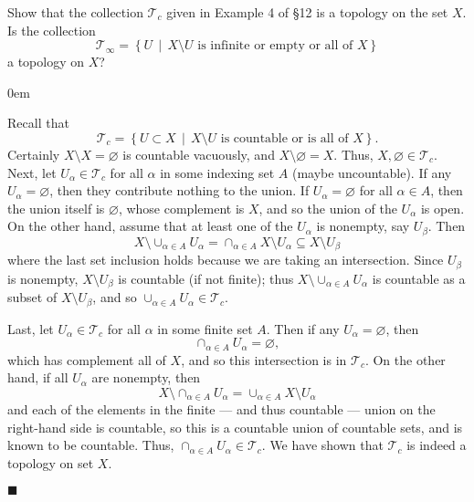 \documentclass[12pt]{article}
\renewcommand{\qed}{\hfill$\blacksquare$}
\renewenvironment{proof}{\begin{addmargin}[1em]{0em}\begin{newproof}}{\end{newproof}\end{addmargin}\qed}
\newenvironment{problem}[2][Exercise]{\begin{trivlist}
\item[\hskip \labelsep {\bfseries #1}\hskip \labelsep {\bfseries #2.}]}{\end{trivlist}}
\begin{document}
\begin{problem}{13.3}
	Show that the collection $\mathcal{T}_c$ given in Example 4 of \S12 is a topology on the set $X$. Is the collection $$ \mathcal{T}_{\infty} = \left\{ U \, \middle| \, X\setminus U \text{ is infinite or empty or all of } X \right\} $$ a topology on $X$?
\end{problem}
\begin{proof}
	Recall that $$\mathcal{T}_c = \left\{ U\subset X \, \middle| \, X\setminus U \text{ is countable or is all of } X \right\}.$$ Certainly $X\setminus X=\varnothing$ is countable vacuously, and $X\setminus \varnothing = X$. Thus, $X,\varnothing \in \mathcal{T}_c$. Next, let $U_{\alpha} \in \mathcal{T}_c$ for all $\alpha$ in some indexing set $A$ (maybe uncountable). If any $U_{\alpha} = \varnothing$, then they contribute nothing to the union. If $U_{\alpha} = \varnothing$ for all $\alpha \in A$, then the union itself is $\varnothing$, whose complement is $X$, and so the union of the $U_{\alpha}$ is open. On the other hand, assume that at least one of the $U_{\alpha}$ is nonempty, say $U_{\beta}$. Then $$ X\setminus \cup_{\alpha \in A} U_{\alpha} = \cap_{\alpha \in A} X\setminus U_{\alpha} \subseteq X\setminus U_{\beta} $$ where the last set inclusion holds because we are taking an intersection. Since $U_{\beta}$ is nonempty, $X\setminus U_{\beta}$ is countable (if not finite); thus $X\setminus \cup_{\alpha \in A}U_{\alpha}$ is countable as a subset of $X\setminus U_{\beta}$, and so $\cup_{\alpha \in A}U_{\alpha} \in \mathcal{T}_c$.
	
	Last, let $U_{\alpha} \in \mathcal{T}_c$ for all $\alpha$ in some finite set $A$. Then if any $U_{\alpha} = \varnothing$, then $$ \cap_{\alpha \in A} U_{\alpha} = \varnothing, $$ which has complement all of $X$, and so this intersection is in $\mathcal{T}_c$. On the other hand, if all $U_{\alpha}$ are nonempty, then $$ X\setminus \cap_{\alpha \in A} U_{\alpha} = \cup_{\alpha \in A} X \setminus U_{\alpha} $$ and each of the elements in the finite --- and thus countable --- union  on the right-hand side is countable, so this is a countable union of countable sets, and is known to be countable. Thus, $\cap_{\alpha \in A} U_{\alpha} \in \mathcal{T}_c$. We have shown that $\mathcal{T}_c$ is indeed a topology on set $X$. 
	
	 
	
\end{proof}
\end{document}
